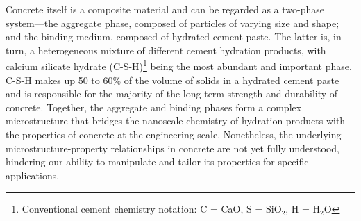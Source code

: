Concrete itself is a composite material and can be regarded as a two-phase system\supercite{mehta2014concrete}---the aggregate phase, composed of particles of varying size and shape; and the binding medium, composed of hydrated cement paste. The latter is, in turn, a heterogeneous mixture of different cement hydration products, with calcium silicate hydrate (C-S-H)\footnote{
Conventional cement chemistry notation: C = CaO, S = SiO$_2$, H = H$_2$O
} being the most abundant and important phase. C-S-H makes up 50 to 60\% of the volume of solids in a hydrated cement paste and is responsible for the majority of the long-term strength and durability of concrete\supercite{mehta2014concrete}. Together, the aggregate and binding phases form a complex microstructure that bridges the nanoscale chemistry of hydration products with the properties of concrete at the engineering scale. Nonetheless, the underlying microstructure-property relationships in concrete are not yet fully understood, hindering our ability to manipulate and tailor its properties for specific applications. 


